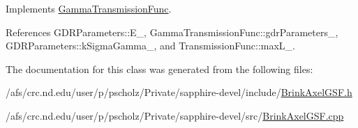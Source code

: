 Implements \hyperlink{classGammaTransmissionFunc_a68156d72ed9620f66f96dc37bbf781aa}{Gamma\-Transmission\-Func}.



References G\-D\-R\-Parameters\-::\-E\-\_\-, Gamma\-Transmission\-Func\-::gdr\-Parameters\-\_\-, G\-D\-R\-Parameters\-::k\-Sigma\-Gamma\-\_\-, and Transmission\-Func\-::max\-L\-\_\-.



The documentation for this class was generated from the following files\-:\begin{DoxyCompactItemize}
\item 
/afs/crc.\-nd.\-edu/user/p/pscholz/\-Private/sapphire-\/devel/include/\hyperlink{BrinkAxelGSF_8h}{Brink\-Axel\-G\-S\-F.\-h}\item 
/afs/crc.\-nd.\-edu/user/p/pscholz/\-Private/sapphire-\/devel/src/\hyperlink{BrinkAxelGSF_8cpp}{Brink\-Axel\-G\-S\-F.\-cpp}\end{DoxyCompactItemize}
